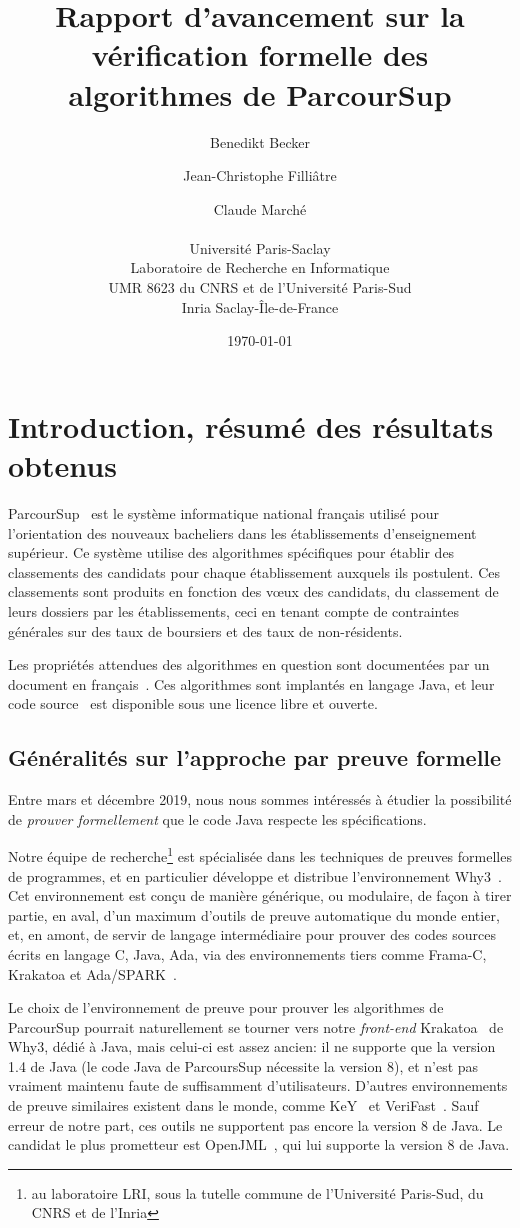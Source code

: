 \documentclass[a4paper]{report}
\title{Rapport d'avancement sur la vérification formelle des algorithmes de ParcourSup}
\author{Benedikt Becker\and Jean-Christophe Filliâtre \and Claude Marché\\
  ~\\
  Université Paris-Saclay\\
  Laboratoire de Recherche en Informatique\\
  UMR 8623 du CNRS et de l'Université Paris-Sud\\
  Inria Saclay-Île-de-France
}
\date{\today}
\begin{document}
\sloppy
\maketitle

\tableofcontents

\chapter{Introduction, résumé des résultats obtenus}


ParcourSup~\cite{parcoursup} est le système informatique national
français utilisé pour l'orientation des nouveaux bacheliers dans les
établissements d'enseignement supérieur. Ce système utilise des
algorithmes spécifiques pour établir des classements des candidats
pour chaque établissement auxquels ils postulent. Ces classements sont
produits en fonction des v{\oe}ux des candidats, du classement de
leurs dossiers par les établissements, ceci en tenant compte de
contraintes générales sur des taux de boursiers et des taux de
non-résidents.

Les propriétés attendues des algorithmes en question sont documentées
par un document en français~\cite{parcoursup-specifications}. Ces
algorithmes sont implantés en langage Java, et leur code
source~\cite{parcoursup-source} est disponible sous une licence libre
et ouverte.

\section{Généralités sur l'approche par preuve formelle}

Entre mars et décembre 2019, nous nous sommes intéressés à étudier la
possibilité de \emph{prouver formellement} que le code Java respecte
les spécifications.

Notre équipe de recherche\footnote{au laboratoire
  LRI, sous la tutelle commune de l'Université Paris-Sud, du CNRS et
  de l'Inria} est spécialisée dans les techniques de preuves formelles
de programmes, et en particulier développe et distribue
l'environnement Why3~\cite{bobot14sttt}. Cet environnement est conçu
de manière générique, ou modulaire, de façon à tirer partie, en aval,
d'un maximum d'outils de preuve automatique du monde entier, et, en
amont, de servir de langage intermédiaire pour prouver des codes
sources écrits en langage C, Java, Ada, via des environnements tiers
comme Frama-C, Krakatoa et Ada/SPARK~\cite{kosmatov16isola}.

Le choix de l'environnement de preuve pour prouver les algorithmes de ParcourSup
pourrait naturellement se tourner vers notre \emph{front-end}
Krakatoa~\cite{marche04jlap,marche09ws} de Why3, dédié à Java, mais celui-ci est
assez ancien: il ne supporte que la version 1.4 de Java (le code Java de
ParcoursSup nécessite la version 8), et n'est pas vraiment maintenu faute de
suffisamment d'utilisateurs. D'autres environnements de preuve similaires
existent dans le monde, comme KeY~\cite{KeYBook2016} et
VeriFast~\cite{jacobs11nfm}. Sauf erreur de notre part, ces outils ne supportent
pas encore la version 8 de Java.
Le candidat le plus prometteur est
OpenJML~\cite{cok14}, qui lui supporte la version 8 de Java.
\end{document}
